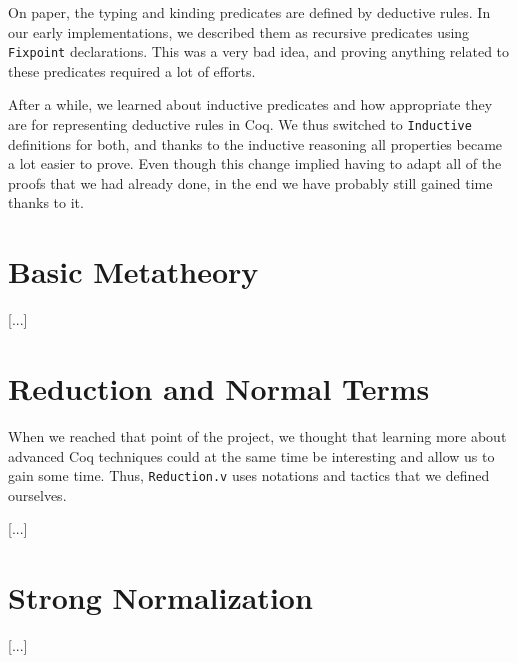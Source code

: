 \documentclass[a4paper,11pt]{article}
\begin{document}
On paper, the typing and kinding predicates are defined by deductive
rules. In our early implementations, we described them as recursive
predicates using \verb|Fixpoint| declarations. This was a very bad
idea, and proving anything related to these predicates required a lot
of efforts.

After a while, we learned about inductive predicates and how
appropriate they are for representing deductive rules in Coq. We thus
switched to \verb|Inductive| definitions for both, and thanks to the
inductive reasoning all properties became a lot easier to prove. Even
though this change implied having to adapt all of the proofs that we
had already done, in the end we have probably still gained time thanks
to it.

\section{Basic Metatheory}

[...]

\section{Reduction and Normal Terms}

When we reached that point of the project, we thought that learning
more about advanced Coq techniques could at the same time be
interesting and allow us to gain some time. Thus, \verb|Reduction.v|
uses notations and tactics that we defined ourselves.

[...]

\section{Strong Normalization}

[...]
\end{document}
